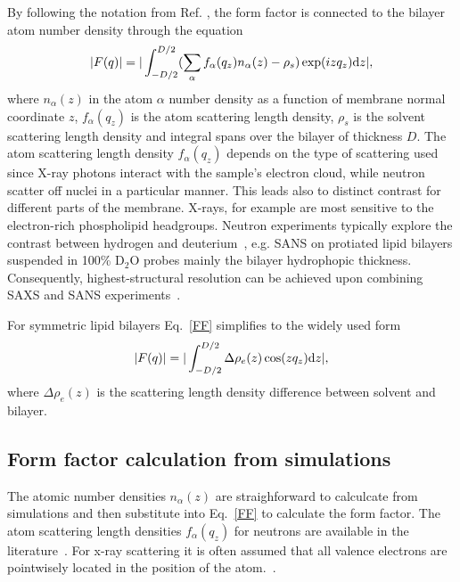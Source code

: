 \documentclass[aps,prl,superscriptaddress,twocolumn]{revtex4}
\begin{document}
By following the notation from Ref. \cite{kucerka10}, the form factor is connected to the bilayer atom number density through the 
equation 
\begin{equation}\label{FF}
|F(q)|=|\int_{-D/2}^{D/2}(\sum_\alpha f_\alpha(q_z)n_\alpha(z) - \rho_s) \exp(i z q_z) {\rm d}z|,
\end{equation}
where $n_\alpha(z)$ in the atom $\alpha$ number density as a function of membrane normal coordinate $z$,
$f_\alpha(q_z)$ is the atom scattering length density,
$\rho_s$ is the solvent scattering length density and integral spans over the bilayer of thickness $D$.
The atom scattering length density $f_\alpha(q_z)$ depends on the type of scattering used since
X-ray photons interact with the sample's electron cloud, while neutron scatter off nuclei in a particular manner.
This leads also to distinct contrast for different parts of the membrane. X-rays, for example are most sensitive to the electron-rich 
phospholipid headgroups. Neutron experiments typically explore the contrast between hydrogen and deuterium~\cite{marquardt15}, 
e.g. SANS on protiated lipid bilayers suspended in 100\% D$_2$O probes mainly the bilayer hydrophopic thickness. 
Consequently, highest-structural resolution can be achieved upon combining SAXS and SANS experiments~\cite{kucerka05,kucerka08a}.

For symmetric lipid bilayers Eq.~\ref{FF} simplifies to the widely used form
\begin{equation}\label{FFsimpl}
|F(q)|=|\int_{-D/2}^{D/2}\Delta \rho_e(z) \cos(zq_z) {\rm d}z|,
\end{equation}
where $\Delta \rho_e(z)$ is the scattering length density difference between solvent and bilayer.

\onecolumngrid
{}


\twocolumngrid

\subsection{Form factor calculation from simulations}
The atomic number densities $n_\alpha(z)$ are straighforward to calculcate from simulations and
then substitute into Eq.~\ref{FF} to calculate the form factor. The atom scattering 
length densities $f_\alpha(q_z)$ for neutrons are available in the literature~\cite{sears92}.
For x-ray scattering it is often assumed that all valence electrons are pointwisely 
located in the position of the atom.~\cite{??}. 
\end{document}
